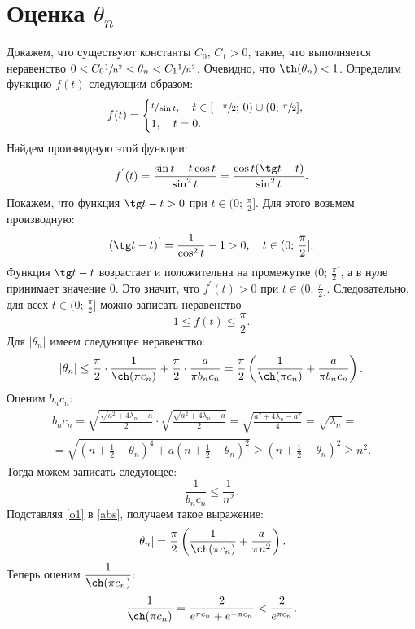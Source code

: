 \documentclass[12pt, a4paper]{article}
\begin{document}
\section{Оценка $\theta_n$}

Докажем, что существуют константы $C_0,\,C_1>0$, такие, что выполняется неравен\-ство $0<C_0\sfrac{1}{n^2}<\theta_n<C_1\sfrac{1}{n^2}$.
Очевидно, что $\th(\theta_n)<1$. Определим функцию $f(t)$ следующим образом:
\[
f(t)=
\begin{cases}
\sfrac{t}{\sin t}, \quad t\in [-\sfrac{\pi}{2};\,0)\cup (0;\,\sfrac{\pi}{2}], \\
1, \quad t=0.
\end{cases}
\]
Найдем производную этой функции:
\[
f^{'}(t)=\frac{\sin t -t\cos t}{\sin^2 t} = \frac{\cos t(\tg t - t)}{\sin^2 t}.
\]
Покажем, что функция $\tg t - t>0$ при $t\in (0;\,\frac{\pi}{2}]$. Для этого возьмем производную:
\[
(\tg t - t)^{'} = \frac{1}{\cos^2 t}-1>0, \quad t\in(0;\,\frac{\pi}{2}].
\]
Функция $\tg t - t$ возрастает и положительна на промежутке $(0;\,\frac{\pi}{2}]$, а в нуле принимает значение 0.
Это значит, что $f^{'}(t)>0$ при $t\in (0;\,\frac{\pi}{2}]$.
Следовательно, для всех $t\in (0;\,\frac{\pi}{2}]$ можно записать неравенство
\[
1\le f(t) \le \frac{\pi}{2}.
\]
Для $|\theta_n|$ имеем следующее неравенство:
\begin{equation}
|\theta_n|\le\frac{\pi}{2}\cdot\frac{1}{\ch(\pi c_n)} + \frac{\pi}{2}\cdot\frac{a}{\pi b_n c_n} = \frac{\pi}{2}\left(\frac{1}{\ch(\pi c_n)} + \frac{a}{\pi b_n c_n}\right). \label{abs}
\end{equation}
Оценим $b_n c_n$:
\begin{multline*}
b_n c_n = \sqrt{\frac{\sqrt{a^2+4\lambda_n}-a}{2}}\cdot \sqrt{\frac{\sqrt{a^2+4\lambda_n}+a}{2}} = \sqrt{\frac{a^2+4\lambda_n-a^2}{4}} = \sqrt{\lambda_n} = \\ = \sqrt{(n+\frac12 - \theta_n)^4 + a(n+\frac12-\theta_n)^2} \ge (n+\frac12 - \theta_n)^2 \ge n^2.
\end{multline*}
Тогда можем записать следующее:
\begin{equation}
\dfrac{1}{b_n c_n} \le \dfrac{1}{n^2}. \label{o1}
\end{equation}
Подставляя \eqref{o1} в \eqref{abs}, получаем такое выражение:
\[
|\theta_n|=\frac{\pi}{2}\left(\frac{1}{\ch(\pi c_n)}+\frac{a}{\pi n^2}\right).
\]
Теперь оценим $\dfrac{1}{\ch(\pi c_n)}$:
\begin{equation}
\frac{1}{\ch(\pi c_n)} = \frac{2}{e^{\pi c_n}+e^{-\pi c_n}} < \frac{2}{e^{\pi c_n}}. \label{o2}
\end{equation}
\end{document}
